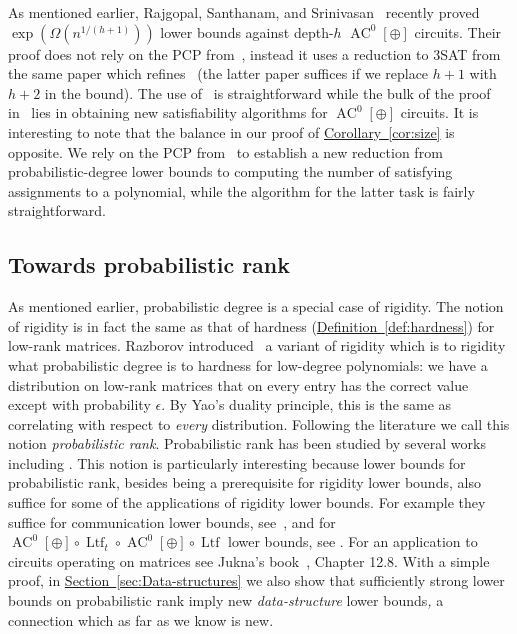 \documentclass[11pt]{article}
\newcommand{\expref}[2]{\texorpdfstring{\hyperref[#2]{#1~\ref{#2}}}{#1~\ref{#2}}}
\DeclareMathOperator{\Ltf}{\mathrm{Ltf}}  %
\DeclareMathOperator{\AC}{\mathrm{AC}}  %
\newcommand{\e}{\epsilon}
\begin{document}
As mentioned earlier, Rajgopal, Santhanam, and Srinivasan~\cite{DBLP:conf/mfcs/RajgopalS018}
recently proved $\exp(\Omega(n^{1/(h+1)}))$ lower bounds against
depth-$h$ $\AC^{0}[\oplus]$ circuits. Their proof does not rely on
the PCP from~\cite{Ben-SassonV-AC0PCP}, instead it uses a reduction
to 3SAT from the same paper which refines~\cite{JahanjouMV-explicit}
(the latter paper suffices if we replace $h+1$ with $h+2$ in the
bound). The use of~\cite{Ben-SassonV-AC0PCP} is straightforward while
the bulk of the proof in~\cite{DBLP:conf/mfcs/RajgopalS018} lies
in obtaining new satisfiability algorithms for $\AC^{0}[\oplus]$ circuits.
It is interesting to note that the balance in our proof 
of \expref{Corollary}{cor:size} is opposite. We rely on the PCP 
from~\cite{Ben-SassonV-AC0PCP}
to establish a new reduction from probabilistic-degree lower bounds
to computing the number of satisfying assignments to a polynomial,
while the algorithm for the latter task is fairly straightforward.

\subsection{Towards probabilistic rank}

As mentioned earlier, probabilistic degree is a special case of rigidity.
The notion of rigidity is in fact the same as that of hardness (\expref{Definition}{def:hardness}) for low-rank matrices. Razborov introduced~\cite{Razborov-rigidity}
a variant of rigidity which is to rigidity what probabilistic degree
is to hardness for low-degree polynomials: we have a distribution
on low-rank matrices that on every entry has the correct value except
with probability $\e$. By Yao's duality principle, this is the same
as correlating with respect to \emph{every }distribution. Following
the literature we call this notion \emph{probabilistic rank}. Probabilistic
rank has been studied by several works including \cite{DBLP:journals/cc/Wunderlich12,AlmanW17}.
This notion is particularly interesting because lower bounds for probabilistic
rank, besides being a prerequisite for rigidity lower bounds, also
suffice for some of the applications of rigidity lower bounds. For
example they suffice for communication lower bounds, see~\cite{DBLP:journals/cc/Wunderlich12},
and for $\AC^{0}[\oplus]\circ \Ltf_{t}\circ \AC^{0}[\oplus]\circ \Ltf$
lower bounds, see \cite{AlmanC19,AlmanW17}. For an application to
circuits operating on matrices see Jukna's book~\cite{Jukna2012},
Chapter 12.8. With a simple proof, in \expref{Section}{sec:Data-structures}
we also show that sufficiently strong lower bounds on probabilistic
rank imply new \emph{data-structure} lower\emph{ }bounds\emph{,} a
connection which as far as we know is new.
\end{document}

